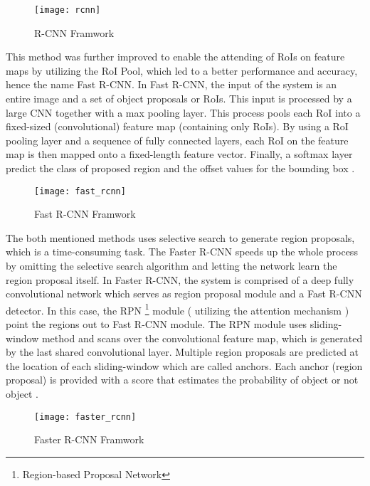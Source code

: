 \begin{figure}[h!]
  \centering
  \texttt{[image: rcnn]}
  \caption[R-CNN]
   {R-CNN Framwork \cite{GirshickDDM13}}
   \label{fig:rcnn}
\end{figure}
\noindent
This method was further improved to enable the attending of RoIs on feature maps by utilizing the RoI Pool, which led to a better performance and accuracy, hence the name Fast R-CNN. In Fast R-CNN, the input of the system is an entire image and a set of object proposals or RoIs. This input is processed by a large CNN together with a max pooling layer. This process pools each RoI into a fixed-sized (convolutional) feature map (containing only RoIs). By using a RoI pooling layer and a sequence of fully connected layers, each RoI on the feature map is then mapped onto a fixed-length feature vector. Finally, a softmax layer predict the class of proposed region and the offset values for the bounding box \cite{Girshick15}.

\begin{figure}[h!]
  \centering
  \texttt{[image: fast\_rcnn]}
  \caption[Fast R-CNN]
   {Fast R-CNN Framwork \cite{Girshick15}}
   \label{fig:fast-rcnn}
\end{figure}

\newpage
\noindent
The both mentioned methods uses selective search to generate region proposals, which is a time-consuming task. The Faster R-CNN speeds up the whole process by omitting the selective search algorithm and letting the network learn the region proposal itself. In Faster R-CNN, the system is comprised of a deep fully convolutional network which serves as region proposal module and a Fast R-CNN detector. In this case, the RPN \footnote{Region-based Proposal Network} module  ( utilizing the attention mechanism \cite{ChorowskiBSCB15})  point the regions out to Fast R-CNN module. The RPN module uses sliding-window method and scans over the convolutional feature map, which is generated by the last shared convolutional layer. Multiple region proposals are predicted at the location of each sliding-window which are called anchors. Each anchor (region proposal) is provided with a score that estimates the probability of object or not object \cite{RenHG015}.

\begin{figure}[h!]
  \centering
  \texttt{[image: faster\_rcnn]}
  \caption[Faster R-CNN]
   {Faster R-CNN Framwork \cite{RenHG015}}
   \label{fig:faster-rcnn}
\end{figure}


